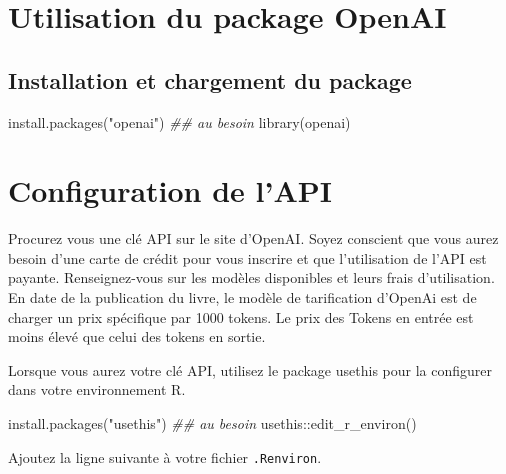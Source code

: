 \documentclass[
  letterpaper,
  DIV=11,
  numbers=noendperiod]{scrreprt}
\newenvironment{Shaded}{\begin{snugshade}}{\end{snugshade}}
\newcommand{\DocumentationTok}[1]{\textcolor[rgb]{0.37,0.37,0.37}{\textit{#1}}}
\newcommand{\FunctionTok}[1]{\textcolor[rgb]{0.28,0.35,0.67}{#1}}
\newcommand{\NormalTok}[1]{\textcolor[rgb]{0.00,0.23,0.31}{#1}}
\newcommand{\SpecialCharTok}[1]{\textcolor[rgb]{0.37,0.37,0.37}{#1}}
\newcommand{\StringTok}[1]{\textcolor[rgb]{0.13,0.47,0.30}{#1}}
\begin{document}
\hypertarget{utilisation-du-package-openai}{%
\section{Utilisation du package
OpenAI}\label{utilisation-du-package-openai}}

\hypertarget{installation-et-chargement-du-package}{%
\subsection{Installation et chargement du
package}\label{installation-et-chargement-du-package}}

\begin{Shaded}
\begin{Highlighting}[]
\FunctionTok{install.packages}\NormalTok{(}\StringTok{"openai"}\NormalTok{) }\DocumentationTok{\#\# au besoin}
\FunctionTok{library}\NormalTok{(openai)}
\end{Highlighting}
\end{Shaded}

\hypertarget{configuration-de-lapi}{%
\section{Configuration de l'API}\label{configuration-de-lapi}}

Procurez vous une clé API sur le site d'OpenAI. Soyez conscient que vous
aurez besoin d'une carte de crédit pour vous inscrire et que
l'utilisation de l'API est payante. Renseignez-vous sur les modèles
disponibles et leurs frais d'utilisation. En date de la publication du
livre, le modèle de tarification d'OpenAi est de charger un prix
spécifique par 1000 tokens. Le prix des Tokens en entrée est moins élevé
que celui des tokens en sortie.

Lorsque vous aurez votre clé API, utilisez le package usethis pour la
configurer dans votre environnement R.

\begin{Shaded}
\begin{Highlighting}[]
\FunctionTok{install.packages}\NormalTok{(}\StringTok{"usethis"}\NormalTok{) }\DocumentationTok{\#\# au besoin}
\NormalTok{usethis}\SpecialCharTok{::}\FunctionTok{edit\_r\_environ}\NormalTok{()}
\end{Highlighting}
\end{Shaded}

Ajoutez la ligne suivante à votre fichier \texttt{.Renviron}.
\end{document}

